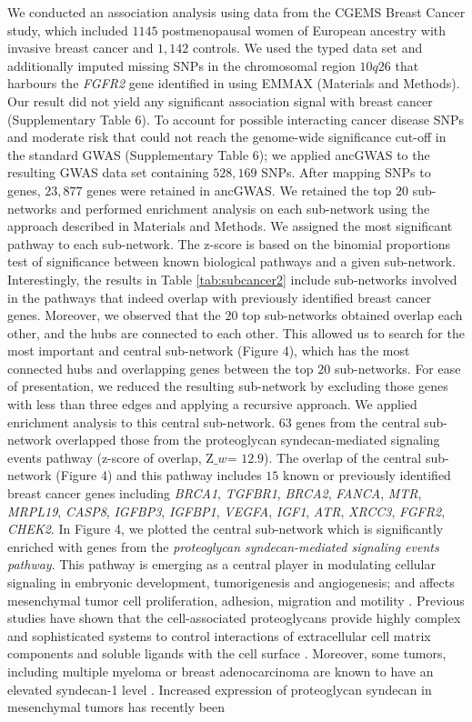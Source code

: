 \documentclass[10pt]{article}
\begin{document}
We conducted an association analysis using data from the CGEMS Breast Cancer study, which included $1145$ postmenopausal women of European ancestry with invasive breast cancer \cite{hunter} and $1,142$ controls. We used the typed data set and additionally imputed missing SNPs \cite{marchi} in the chromosomal region $10q26$ that harbours the \textit{FGFR2} gene identified in \cite{hunter} using EMMAX (Materials and Methods). Our result did not yield any significant association signal with breast cancer (Supplementary Table 6). To account for possible interacting cancer disease SNPs and moderate risk that could not reach the genome-wide significance cut-off in the standard GWAS (Supplementary Table 6); we applied ancGWAS to the resulting GWAS data set containing $528,169$ SNPs. After mapping SNPs to genes, $23,877$ genes were retained in ancGWAS. We retained the top $20$ sub-networks and performed enrichment analysis on each sub-network using the approach described in Materials and Methods. We assigned the most significant pathway to each sub-network. The z-score is based on the binomial proportions test \cite{berge} of significance between known biological pathways and a given sub-network. Interestingly, the results in Table \ref{tab:subcancer2} include sub-networks involved in the pathways that indeed overlap with previously identified breast cancer genes. Moreover, we observed that the $20$ top sub-networks obtained overlap each other, and the hubs are connected to each other. This allowed us to search for the most important and central sub-network (Figure 4), which has the most connected hubs and overlapping genes between the top $20$ sub-networks. For ease of presentation, we reduced the resulting sub-network by excluding those genes with less than three edges and applying a recursive approach. We applied enrichment analysis to this central sub-network. $63$ genes from the central sub-network overlapped those from the proteoglycan syndecan-mediated signaling events pathway (z-score of overlap, Z$\_w$= $12.9$). The overlap of the central sub-network (Figure 4) and this pathway includes $15$ known or previously identified breast cancer genes including \textit{BRCA1}, \textit{TGFBR1}, \textit{BRCA2}, \textit{FANCA}, \textit{MTR}, \textit{MRPL19}, \textit{CASP8}, \textit{IGFBP3}, \textit{IGFBP1}, \textit{VEGFA}, \textit{IGF1}, \textit{ATR}, \textit{XRCC3}, \textit{FGFR2}, \textit{CHEK2}. In Figure 4, we plotted the central sub-network which is significantly enriched with genes from the \textit{proteoglycan syndecan-mediated signaling events pathway}. This pathway is emerging as a central player in modulating cellular signaling in embryonic development, tumorigenesis and angiogenesis; and affects mesenchymal tumor cell proliferation, adhesion, migration and motility \cite{breasta,breastb,breastd}. Previous studies have shown that the cell-associated proteoglycans provide highly complex and sophisticated systems to control interactions of extracellular cell matrix components and soluble ligands with the cell surface \cite{breasta,breastb,breastc,breastd}. Moreover, some tumors, including multiple myeloma or breast adenocarcinoma are known to have an elevated syndecan-1 level \cite{breastb}. Increased expression of proteoglycan syndecan in mesenchymal tumors has recently been 
\end{document}
